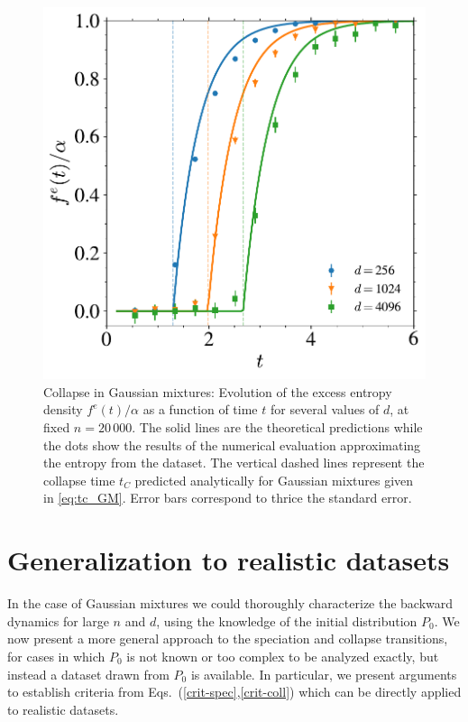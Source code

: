 \documentclass[10pt,twocolumn]{article}
\begin{document}
\begin{figure}[!htb]
\centering
\includegraphics[width=1\linewidth]{Figures/Collapse_GM.pdf}
\caption{Collapse in Gaussian mixtures: Evolution of the excess entropy density $f^e(t)/\alpha$ as a function of time $t$ for several values of $d$, at fixed $n=20\,000$. The solid lines are the theoretical predictions while the dots show the results of the numerical evaluation approximating the entropy from the dataset. The vertical dashed lines represent the collapse time $t_C$ predicted analytically for Gaussian mixtures given in \eqref{eq:tc_GM}. Error bars correspond to thrice the standard error.}
\label{fig:Collapse_GM}  
\end{figure}

\section*{Generalization to realistic datasets}
In the case of Gaussian mixtures we could thoroughly characterize the backward dynamics for large $n$ and $d$, using the knowledge of the initial distribution $P_0$. We now present a more general approach to the speciation and collapse transitions, for cases in which $P_0$ is not known or too complex to be analyzed exactly, but instead a dataset drawn from $P_0$ is available. In particular, we present arguments to establish criteria from Eqs.~(\ref{crit-spec},\ref{crit-coll}) which can be directly applied to realistic datasets.
\end{document}
